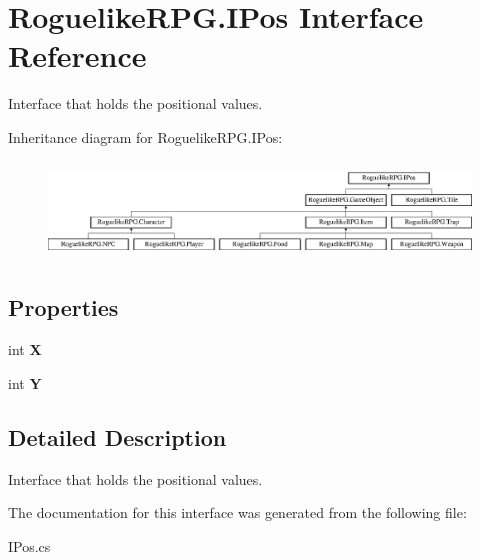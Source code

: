 \hypertarget{interface_roguelike_r_p_g_1_1_i_pos}{}\section{Roguelike\+R\+P\+G.\+I\+Pos Interface Reference}
\label{interface_roguelike_r_p_g_1_1_i_pos}


Interface that holds the positional values.  


Inheritance diagram for Roguelike\+R\+P\+G.\+I\+Pos\+:\begin{figure}[H]
\begin{center}
\leavevmode
\includegraphics[height=2.589595cm]{interface_roguelike_r_p_g_1_1_i_pos}
\end{center}
\end{figure}
\subsection*{Properties}
\begin{DoxyCompactItemize}
\item 
\mbox{\label{interface_roguelike_r_p_g_1_1_i_pos_aa40fce67404021056f1aef51a1e97e05}} 
int {\bfseries X}
\item 
\mbox{\label{interface_roguelike_r_p_g_1_1_i_pos_afe7826d4293121d8f12f65ea6797563a}} 
int {\bfseries Y}
\end{DoxyCompactItemize}


\subsection{Detailed Description}
Interface that holds the positional values. 



The documentation for this interface was generated from the following file\+:\begin{DoxyCompactItemize}
\item 
I\+Pos.\+cs\end{DoxyCompactItemize}
